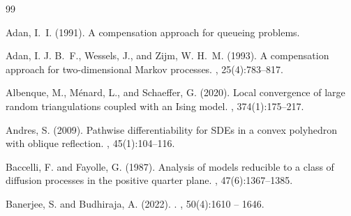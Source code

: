 \documentclass[11pt]{article}
\theoremstyle{definition}
\begin{document}
\begin{thebibliography}{99}

\small

Adan, I.~I. (1991).
\newblock A compensation approach for queueing problems.

Adan, I. J. B.~F., Wessels, J., and Zijm, W. H.~M. (1993).
\newblock A compensation approach for two-dimensional Markov processes.
, 25(4):783–817.

Albenque, M., M{\'{e}}nard, L., and Schaeffer, G. (2020).
\newblock Local convergence of large random triangulations coupled with an
  Ising model.
,
  374(1):175--217.


Andres, S. (2009).
\newblock Pathwise differentiability for SDEs in a convex polyhedron with oblique reflection.
, 45(1):104--116.

Baccelli, F. and Fayolle, G. (1987).
\newblock Analysis of models reducible to a class of diffusion processes in the
  positive quarter plane.
, 47(6):1367--1385.


Banerjee, S. and Budhiraja, A. (2022).
.
, 50(4):1610 -- 1646.



\end{thebibliography}
\end{document}

